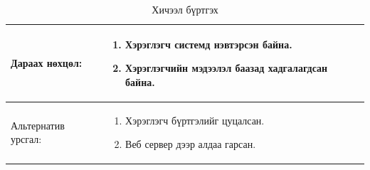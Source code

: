 \begin{center}
\begin{table}[!htbp]
\begin{tabular}{|p{2cm}|p{13cm}|}
\\					  \hline
				Дараах нөхцөл: &
				 \begin{enumerate}
									\item Хэрэглэгч системд нэвтэрсэн байна. 
									\item Хэрэглэгчийн мэдээлэл баазад хадгалагдсан байна. 
				\end{enumerate}	   
\\				   \hline
				Альтернатив урсгал: &  \begin{enumerate}
									\item Хэрэглэгч бүртгэлийг цуцалсан.
									\item Веб сервер дээр алдаа гарсан. 
										\end{enumerate}
				\\	\hline
		\end{tabular}
	\caption{Хичээл бүртгэх}
	\end{table}
\end{center}
